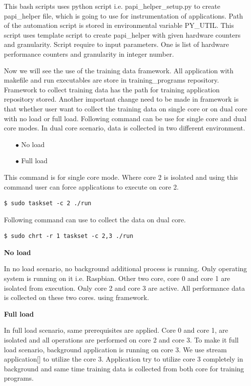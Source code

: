 This bash scripts uses python script i.e. papi\_helper\_setup.py to create papi\_helper file, which is going to use for instrumentation of applications. Path of the automation script is stored in environmental variable PY\_UTIL. This script uses template script to create papi\_helper with given hardware counters and granularity. Script require to input parameters. One is list of hardware performance counters and granularity in integer number. 

\par Now we will see the use of the training data framework. All application with makefile and run executables are store in training\_programs repository. Framework to collect training data has the path for training application repository stored. Another important change need to be made in framework is that whether user want to collect the training data on single core or on dual core with no load or full load. Following command can be use for single core and dual core modes. In dual core scenario, data is collected in two different environment. 
\begin{itemize}
\item[$\bullet$] No load
\item[$\bullet$] Full load
\end{itemize}

This command is for single core mode. Where core 2 is isolated and using this command user can force applications to execute on core 2.
\begin{lstlisting}
$ sudo taskset -c 2 ./run
\end{lstlisting}

Following command can use to collect the data on dual core. 
\begin{lstlisting}
$ sudo chrt -r 1 taskset -c 2,3 ./run
\end{lstlisting}

\textbf{No load}
\par In no load scenario, no background additional process is running. Only operating system is running on it i.e. Raspbian. Other two core, core 0 and core 1 are isolated from execution. Only core 2 and core 3 are active. All performance data is collected on these two cores. using framework. 

\textbf{Full load}
\par In full load scenario, same prerequisites are applied. Core 0 and core 1, are isolated and all operations are performed on core 2 and core 3. To make it full load scenario, background application is running on core 3. We use stream application[] to utilize the core 3. Application try to utilize core 3 completely in background and same time training data is collected from both core for training programs. 

